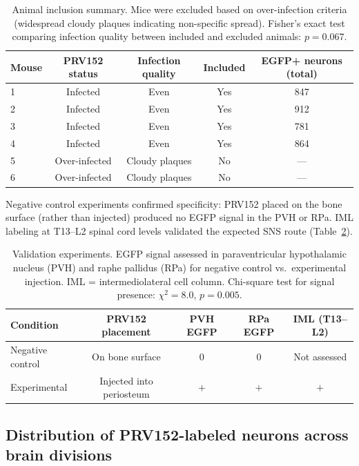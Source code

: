 \documentclass[11pt]{article}
\begin{document}
\begin{table}[H]
\centering
\caption{Animal inclusion summary. Mice were excluded based on over-infection criteria (widespread cloudy plaques indicating non-specific spread). Fisher's exact test comparing infection quality between included and excluded animals: $p = 0.067$.}
\label{tab:animals}
\begin{tabular}{lcccc}
\toprule
\textbf{Mouse} & \textbf{PRV152 status} & \textbf{Infection quality} & \textbf{Included} & \textbf{EGFP+ neurons (total)} \\
\midrule
1 & Infected & Even & Yes & 847 \\
2 & Infected & Even & Yes & 912 \\
3 & Infected & Even & Yes & 781 \\
4 & Infected & Even & Yes & 864 \\
5 & Over-infected & Cloudy plaques & No & --- \\
6 & Over-infected & Cloudy plaques & No & --- \\
\bottomrule
\end{tabular}
\end{table}

Negative control experiments confirmed specificity: PRV152 placed on the bone surface (rather than injected) produced no EGFP signal in the PVH or RPa. IML labeling at T13--L2 spinal cord levels validated the expected SNS route (Table~\ref{tab:validation}).

\begin{table}[H]
\centering
\caption{Validation experiments. EGFP signal assessed in paraventricular hypothalamic nucleus (PVH) and raphe pallidus (RPa) for negative control vs.\ experimental injection. IML = intermediolateral cell column. Chi-square test for signal presence: $\chi^2 = 8.0$, $p = 0.005$.}
\label{tab:validation}
\begin{tabular}{lcccc}
\toprule
\textbf{Condition} & \textbf{PRV152 placement} & \textbf{PVH EGFP} & \textbf{RPa EGFP} & \textbf{IML (T13--L2)} \\
\midrule
Negative control & On bone surface & 0 & 0 & Not assessed \\
Experimental & Injected into periosteum & $+$ & $+$ & $+$ \\
\bottomrule
\end{tabular}
\end{table}

\subsection{Distribution of PRV152-labeled neurons across brain divisions}
\end{document}
